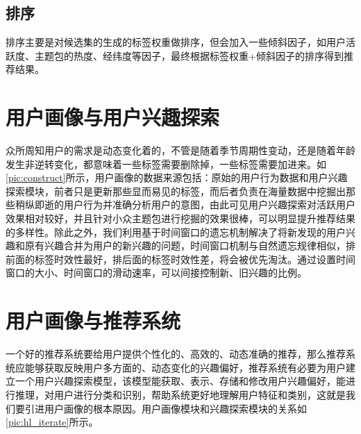     \subsection{排序}
    排序主要是对候选集的生成的标签权重做排序，但会加入一些倾斜因子，如用户活跃度、主题包的热度、经纬度等因子，最终根据标签权重+倾斜因子的排序得到推荐结果。

  \section{用户画像与用户兴趣探索}
  众所周知用户的需求是动态变化着的，不管是随着季节周期性变动，还是随着年龄发生非逆转变化，都意味着一些标签需要删除掉，一些标签需要加进来。如\autoref{pic:construct}所示，用户画像的数据来源包括：原始的用户行为数据和用户兴趣探索模块，前者只是更新那些显而易见的标签，而后者负责在海量数据中挖掘出那些稍纵即逝的用户行为并准确分析用户的意图，由此可见用户兴趣探索对活跃用户效果相对较好，并且针对小众主题包进行挖掘的效果很棒，可以明显提升推荐结果的多样性。除此之外，我们利用基于时间窗口的遗忘机制解决了将新发现的用户兴趣和原有兴趣合并为用户的新兴趣的问题，时间窗口机制与自然遗忘规律相似，排前面的标签时效性最好，排后面的标签时效性差，将会被优先淘汰。通过设置时间窗口的大小、时间窗口的滑动速率，可以间接控制新、旧兴趣的比例。

  \section{用户画像与推荐系统}
  一个好的推荐系统要给用户提供个性化的、高效的、动态准确的推荐，那么推荐系统应能够获取反映用户多方面的、动态变化的兴趣偏好，推荐系统有必要为用户建立一个用户兴趣探索模型，该模型能获取、表示、存储和修改用户兴趣偏好，能进行推理，对用户进行分类和识别，帮助系统更好地理解用户特征和类别，这就是我们要引进用户画像的根本原因。用户画像模块和兴趣探索模块的关系如\autoref{pic:hl_iterate}所示。
  \begin{figure}
    \centering
      \label{pic:hl_iterate}
  \end{figure}

